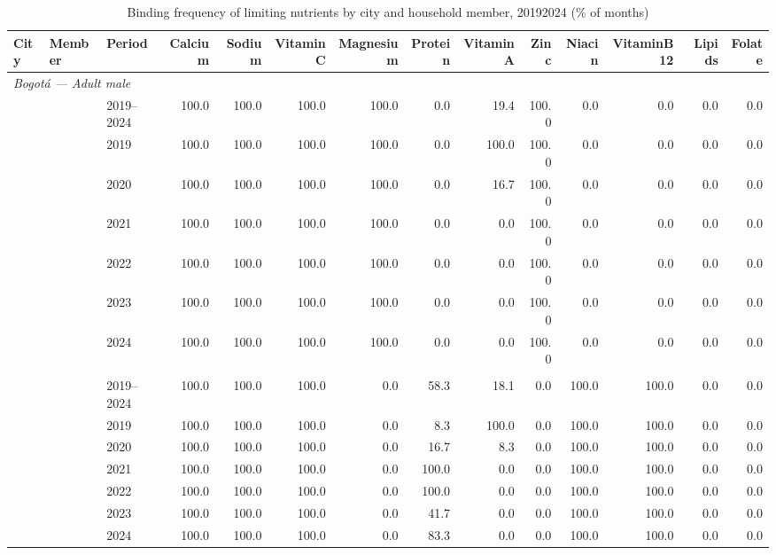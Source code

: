 \begin{table}[htbp]
\centering
\begingroup
\fontsize{7}{8.5}\selectfont
\setlength{\tabcolsep}{3.5pt}
\renewcommand{\arraystretch}{0.95}
\caption{Binding frequency of limiting nutrients by city and household member, 2019\textendash{}2024 (\% of months)}
\label{tab:binding_frequency}
\begin{tabular}{lllrrrrrrrrrrr}
\toprule
City & Member & Period & Calcium & Sodium & VitaminC & Magnesium & Protein & VitaminA & Zinc & Niacin & VitaminB12 & Lipids & Folate \\
\midrule
\multicolumn{14}{l}{\textit{Bogotá --- Adult male}} \\
 & & 2019–2024 & 100.0 & 100.0 & 100.0 & 100.0 & 0.0 & 19.4 & 100.0 & 0.0 & 0.0 & 0.0 & 0.0 \\
 & & 2019 & 100.0 & 100.0 & 100.0 & 100.0 & 0.0 & 100.0 & 100.0 & 0.0 & 0.0 & 0.0 & 0.0 \\
 & & 2020 & 100.0 & 100.0 & 100.0 & 100.0 & 0.0 & 16.7 & 100.0 & 0.0 & 0.0 & 0.0 & 0.0 \\
 & & 2021 & 100.0 & 100.0 & 100.0 & 100.0 & 0.0 & 0.0 & 100.0 & 0.0 & 0.0 & 0.0 & 0.0 \\
 & & 2022 & 100.0 & 100.0 & 100.0 & 100.0 & 0.0 & 0.0 & 100.0 & 0.0 & 0.0 & 0.0 & 0.0 \\
 & & 2023 & 100.0 & 100.0 & 100.0 & 100.0 & 0.0 & 0.0 & 100.0 & 0.0 & 0.0 & 0.0 & 0.0 \\
 & & 2024 & 100.0 & 100.0 & 100.0 & 100.0 & 0.0 & 0.0 & 100.0 & 0.0 & 0.0 & 0.0 & 0.0 \\
\addlinespace[2pt]
\multicolumn{14}{l}{\textit{Bogotá --- Adult female}} \\
 & & 2019–2024 & 100.0 & 100.0 & 100.0 & 0.0 & 58.3 & 18.1 & 0.0 & 100.0 & 100.0 & 0.0 & 0.0 \\
 & & 2019 & 100.0 & 100.0 & 100.0 & 0.0 & 8.3 & 100.0 & 0.0 & 100.0 & 100.0 & 0.0 & 0.0 \\
 & & 2020 & 100.0 & 100.0 & 100.0 & 0.0 & 16.7 & 8.3 & 0.0 & 100.0 & 100.0 & 0.0 & 0.0 \\
 & & 2021 & 100.0 & 100.0 & 100.0 & 0.0 & 100.0 & 0.0 & 0.0 & 100.0 & 100.0 & 0.0 & 0.0 \\
 & & 2022 & 100.0 & 100.0 & 100.0 & 0.0 & 100.0 & 0.0 & 0.0 & 100.0 & 100.0 & 0.0 & 0.0 \\
 & & 2023 & 100.0 & 100.0 & 100.0 & 0.0 & 41.7 & 0.0 & 0.0 & 100.0 & 100.0 & 0.0 & 0.0 \\
 & & 2024 & 100.0 & 100.0 & 100.0 & 0.0 & 83.3 & 0.0 & 0.0 & 100.0 & 100.0 & 0.0 & 0.0 \\

\end{tabular}
\end{table}
